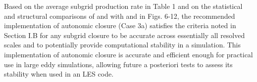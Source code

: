 Based on the average subgrid production rate in Table 1 and on the statistical and structural comparisons of   and   with   and   in Figs. 6-12, the recommended implementation of autonomic closure (Case 3a) satisfies the criteria noted in Section I.B for any subgrid closure to be accurate across essentially all resolved scales and to potentially provide computational stability in a simulation. This implementation of autonomic closure is accurate and efficient enough for practical use in large eddy simulations, allowing future a posteriori tests to assess its stability when used in an LES code.




